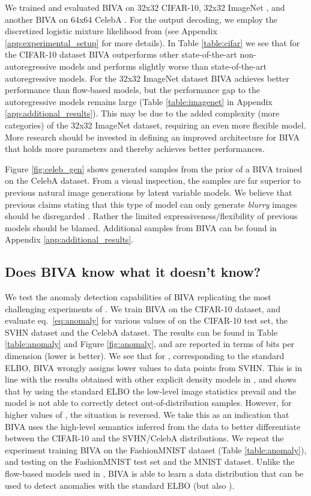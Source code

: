 \documentclass{article}
\def\nm{BIVA\xspace}
\begin{document}
We trained and evaluated \nm  on 32x32 CIFAR-10, 32x32 ImageNet \citep{Oord2015}, and another \nm  on 64x64 CelebA \citep{Larsen16}. For the output decoding, we employ the discretized logistic mixture likelihood from \citep{Salimans17} (see Appendix \ref{app:experimental_setup} for more details). In Table \ref{table:cifar} we see that for the CIFAR-10 dataset \nm outperforms other state-of-the-art non-autoregressive models and performs slightly worse than state-of-the-art autoregressive models. For the 32x32 ImageNet dataset \nm achieves better performance than flow-based models, but the performance gap to the autoregressive models remains large (Table \ref{table:imagenet} in Appendix \ref{app:additional_results}). This may be due to the added complexity (more categories) of the 32x32 ImageNet dataset, requiring an even more flexible model. More research should be invested in defining an improved architecture for \nm that holds more parameters and thereby achieves better performances. 

Figure \ref{fig:celeb_gen} shows generated samples from the  prior of a \nm  trained on the CelebA dataset. From a visual inspection, the samples are far superior to previous natural image generations by latent variable models. We believe that previous claims stating that this type of model can only generate \textit{blurry} images should be disregarded \citep{Larsen16}. Rather the limited expressiveness/flexibility of previous models should be blamed. Additional samples from \nm can be found in Appendix \ref{app:additional_results}.

\subsection{Does \nm know what it doesn't know?}

We test the anomaly detection capabilities of \nm replicating the most challenging experiments of \citep{Nalisnick18}.
We train \nm  on the CIFAR-10 dataset, and evaluate eq.~\eqref{eq:anomaly} for various values of  on the CIFAR-10 test set, the SVHN dataset \citep{Netzer2011} and the CelebA dataset. The results can be found in Table \ref{table:anomaly} and Figure \ref{fig:anomaly}, and are reported in terms of bits per dimension (lower is better).
We see that for , corresponding to the standard ELBO, \nm wrongly assigns lower values to data points from SVHN. This is in line with the results obtained with other explicit density models in \citep{Nalisnick18}, and shows that by using the standard ELBO the low-level image statistics prevail and the model is not able to correctly detect out-of-distribution samples. However, for higher values of , the situation is reversed. We take this as an indication that \nm uses the high-level semantics inferred from the data to better differentiate between the CIFAR-10 and the SVHN/CelebA distributions.
We repeat the experiment training \nm  on the FashionMNIST dataset (Table \ref{table:anomaly}), and testing on the FashionMNIST test set and the MNIST dataset. Unlike the flow-based models used in \citep{Nalisnick18}, \nm is able to learn a data distribution that can be used to detect anomalies with the standard ELBO (but also ).
\end{document}
